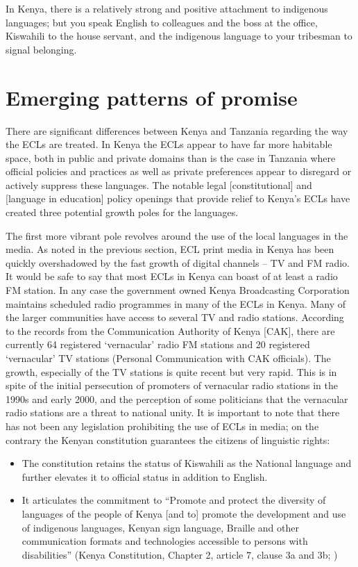 \documentclass[output=paper,colorlinks,citecolor=brown]{langscibook}
\begin{document}
In Kenya, there is a relatively strong and positive attachment to indigenous languages; but you speak English to colleagues and the boss at the office, Kiswahili to the house servant, and the indigenous language to your tribesman to signal belonging.

\section{Emerging patterns of promise}\label{sec:kioko:3}

There are significant differences between Kenya and Tanzania regarding the way the ECLs are treated. In Kenya the ECLs appear to have far more habitable space, both in public and private domains than is the case in Tanzania where official policies and practices as well as private preferences appear to disregard or actively suppress these languages. The notable legal [constitutional] and [language in education] policy openings that provide relief to Kenya’s ECLs have created three potential growth poles for the languages. 

The first more vibrant pole revolves around the use of the local languages in the media. As noted in the previous section, ECL print media in Kenya has been quickly overshadowed by the fast growth of digital channels – TV and FM radio. It would be safe to say that most ECLs in Kenya can boast of at least a radio FM station. In any case the government owned Kenya Broadcasting Corporation maintains scheduled radio programmes in many of the ECLs in Kenya. Many of the larger communities have access to several TV and radio stations. According to the records from the Communication Authority of Kenya [CAK], there are currently 64 registered ‘vernacular’ radio FM stations and 20 registered ‘vernacular’ TV stations (Personal Communication with CAK officials).  The growth, especially of the TV stations is quite recent but very rapid.  This is in spite of the initial persecution of promoters of vernacular radio stations in the 1990s and early 2000, and the perception of some politicians that the vernacular radio stations are a threat to national unity.  It is important to note that there has not been any legislation prohibiting the use of ECLs in media; on the contrary the Kenyan constitution guarantees the citizens of linguistic rights:

\begin{itemize}
    \item The constitution retains the status of Kiswahili as the National language and further elevates it to official status in addition to English.  
    \item It articulates the commitment to “Promote and protect the diversity of languages of the people of Kenya [and to] promote the development and use of indigenous languages, Kenyan sign language, Braille and other communication formats and technologies accessible to persons with disabilities” (Kenya Constitution, Chapter 2, article 7, clause 3a and 3b; \citealt{Republic-of-Kenya2010})

\end{itemize}{}
\end{document}
